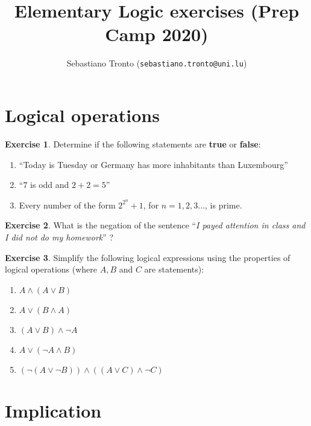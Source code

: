 \documentclass[a4paper,oneside]{article}
\author{Sebastiano Tronto (\texttt{sebastiano.tronto@uni.lu})}
\title{Elementary Logic exercises (Prep Camp 2020)}
\theoremstyle{definition} \newtheorem{exercise}{Exercise}[section]
\begin{document}
\maketitle

\section{Logical operations}

\begin{exercise}
  Determine if the following statements are \textbf{true} or \textbf{false}:
  \begin{enumerate}
    \item ``Today is Tuesday or Germany has more inhabitants than Luxembourg''
    \item ``$7$ is odd and $2+2=5$''
    \item Every number of the form $2^{2^n}+1$, for $n=1,2,3...$, is prime.
  \end{enumerate}
\end{exercise}

\begin{exercise}
  What is the negation of the sentence ``\emph{I payed attention in class and I
  did not do my homework}'' ?
\end{exercise}

\begin{exercise}
  Simplify the following logical expressions using the properties of logical
  operations (where $A,B$ and $C$ are statements):
  \begin{enumerate}
    \item $A\land(A\lor B)$
    \item $A\lor (B\land A)$
    \item $(A\lor B) \land \neg A$
    \item $A \lor (\neg A\land B)$
    \item $(\neg (A\lor \neg B))\land ((A\lor C) \land \neg C)$
  \end{enumerate}
\end{exercise}

\section{Implication}
\end{document}
